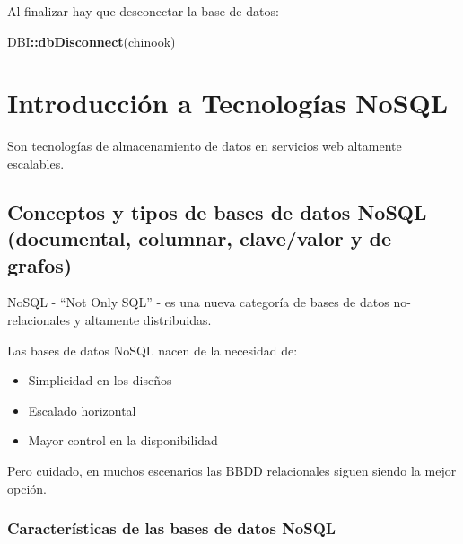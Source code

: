 \documentclass[
]{book}
\newenvironment{Shaded}{\begin{snugshade}}{\end{snugshade}}
\newcommand{\FunctionTok}[1]{\textcolor[rgb]{0.13,0.29,0.53}{\textbf{#1}}}
\newcommand{\NormalTok}[1]{#1}
\newcommand{\SpecialCharTok}[1]{\textcolor[rgb]{0.81,0.36,0.00}{\textbf{#1}}}
\begin{document}
Al finalizar hay que desconectar la base de datos:

\begin{Shaded}
\begin{Highlighting}[]
\NormalTok{DBI}\SpecialCharTok{::}\FunctionTok{dbDisconnect}\NormalTok{(chinook)            }
\end{Highlighting}
\end{Shaded}

\chapter{Introducción a Tecnologías NoSQL}\label{introducciuxf3n-a-tecnologuxedas-nosql}

Son tecnologías de almacenamiento de datos en servicios web altamente escalables.

\section{Conceptos y tipos de bases de datos NoSQL (documental, columnar, clave/valor y de grafos)}\label{conceptos-y-tipos-de-bases-de-datos-nosql-documental-columnar-clavevalor-y-de-grafos}

NoSQL - ``Not Only SQL'' - es una nueva categoría de bases de datos no-relacionales y altamente distribuidas.

Las bases de datos NoSQL nacen de la necesidad de:

\begin{itemize}
\item
  Simplicidad en los diseños
\item
  Escalado horizontal
\item
  Mayor control en la disponibilidad
\end{itemize}

Pero cuidado, en muchos escenarios las BBDD relacionales siguen siendo la mejor opción.

\subsection{Características de las bases de datos NoSQL}\label{caracteruxedsticas-de-las-bases-de-datos-nosql}
\end{document}
